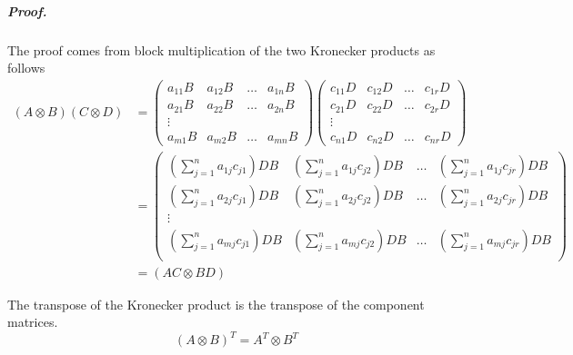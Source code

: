 \documentclass[11pt,a4paper,twoside]{report}
\begin{document}
\subparagraph{Proof.} The proof comes from block multiplication of the two Kronecker products as
follows
\begin{align*}\label{}
(A \otimes B)(C \otimes D) &= 
\begin{pmatrix}
a_{11}B & a_{12}B & \ldots & a_{1n}B\\
a_{21}B & a_{22}B & \ldots & a_{2n}B\\
\vdots& & &\\
a_{m1}B & a_{m2}B & \ldots & a_{mn}B
\end{pmatrix}
\begin{pmatrix}
c_{11}D & c_{12}D & \ldots & c_{1r}D\\
c_{21}D & c_{22}D & \ldots & c_{2r}D\\
\vdots& & &\\
c_{n1}D & c_{n2}D & \ldots & c_{nr}D
\end{pmatrix}\\
&=\begin{pmatrix}
(\sum_{j=1}^n a_{1j}c_{j1})DB & (\sum_{j=1}^n a_{1j}c_{j2})DB & \ldots &
  (\sum_{j=1}^n a_{1j}c_{jr})DB\\ 
(\sum_{j=1}^n a_{2j}c_{j1})DB & (\sum_{j=1}^n a_{2j}c_{j2})DB & \ldots & (\sum_{j=1}^n a_{2j}c_{jr})DB\\ 
\vdots&  &\\
(\sum_{j=1}^n a_{mj}c_{j1})DB & (\sum_{j=1}^n a_{mj}c_{j2})DB & \ldots & (\sum_{j=1}^n a_{mj}c_{jr})DB\\ 
\end{pmatrix}\\
&= (AC \otimes BD)
\end{align*}

The transpose of the Kronecker product is the transpose of the component
matrices.
\begin{equation}\label{eq:krontran}
(A \otimes B)^T = A^T \otimes B^T
\end{equation}
\end{document}

